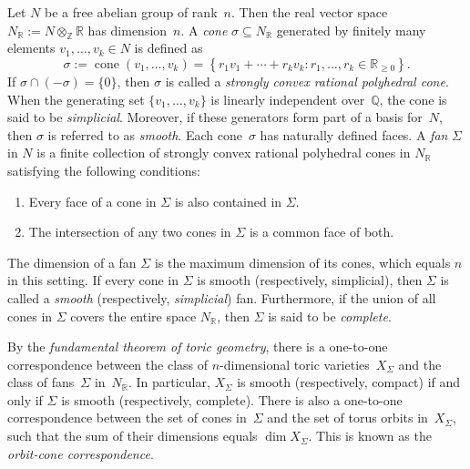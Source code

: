 \documentclass[10pt]{amsart}
\theoremstyle{plain}
\numberwithin{equation}{section}
\theoremstyle{definition}
\newcommand{\R}{\mathbb{R}}
\newcommand{\Z}{\mathbb{Z}}
\DeclareMathOperator{\cone}{cone}
\begin{document}
Let $N$ be a free abelian group of rank~$ n $. Then the real vector space $ N_\R := N \otimes_\Z \R $ has dimension~$ n $. A \emph{cone} $ \sigma \subseteq N_\R $ generated by finitely many elements $ v_1, \dots, v_k \in N $ is defined as
$$
\sigma := \cone (v_1,\ldots,v_k) = \left\{ r_1 v_1 + \cdots + r_k v_k \colon r_1, \dots, r_k \in \R_{\ge 0} \right\}.
$$
If $ \sigma \cap (-\sigma) = \{0\} $, then $ \sigma $ is called a \emph{strongly convex rational polyhedral cone}. When the generating set $ \{v_1, \dots, v_k\} $ is linearly independent over~$ \mathbb{Q} $, the cone is said to be \emph{simplicial}. Moreover, if these generators form part of a basis for~$ N $, then $ \sigma $ is referred to as \emph{smooth}.
Each cone~$ \sigma $ has naturally defined faces. A \emph{fan} $\Sigma$ in $ N $ is a finite collection of strongly convex rational polyhedral cones in $ N_\mathbb{R} $ satisfying the following conditions:
\begin{enumerate}
    \item Every face of a cone in $\Sigma$ is also contained in $\Sigma$.
    \item The intersection of any two cones in $\Sigma$ is a common face of both.
\end{enumerate}
The dimension of a fan $\Sigma$ is the maximum dimension of its cones, which equals $n$ in this setting.
If every cone in $\Sigma$ is smooth (respectively, simplicial), then $\Sigma$ is called a \emph{smooth} (respectively, \emph{simplicial}) fan. Furthermore, if the union of all cones in $\Sigma$ covers the entire space $N_\R$, then $\Sigma$ is said to be \emph{complete}.

By the \emph{fundamental theorem of toric geometry}, there is a one-to-one correspondence between the class of $n$-dimensional toric varieties~$X_\Sigma$ and the class of fans~$\Sigma$ in~$N_\R$.
In particular, $X_\Sigma$ is smooth (respectively, compact) if and only if $\Sigma$ is smooth (respectively, complete).
There is also a one-to-one correspondence between the set of cones in~$\Sigma$ and the set of torus orbits in~$X_\Sigma$, such that the sum of their dimensions equals $\dim X_\Sigma$.
This is known as the \emph{orbit-cone correspondence}.
\end{document}
